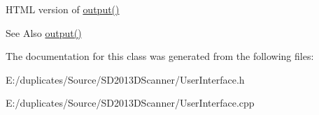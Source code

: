 H\-T\-M\-L version of \hyperlink{class_user_interface_a13170d15472392870c9a9863360a5423}{output()} \begin{DoxySeeAlso}{See Also}
\hyperlink{class_user_interface_a13170d15472392870c9a9863360a5423}{output()} 
\end{DoxySeeAlso}


The documentation for this class was generated from the following files\-:\begin{DoxyCompactItemize}
\item 
E\-:/duplicates/\-Source/\-S\-D2013\-D\-Scanner/User\-Interface.\-h\item 
E\-:/duplicates/\-Source/\-S\-D2013\-D\-Scanner/User\-Interface.\-cpp\end{DoxyCompactItemize}
